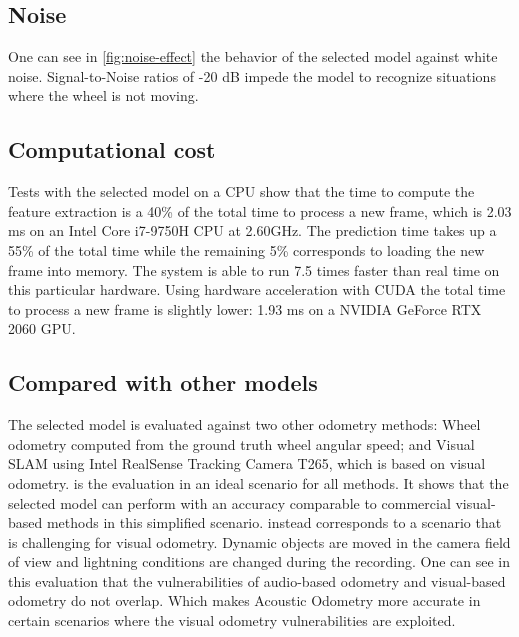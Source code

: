 \subsection{Noise} One can see in \cref{fig:noise-effect} the behavior of the
selected model against white noise. Signal-to-Noise ratios of -20 dB impede the model to
recognize situations where the wheel is not moving.

\begin{figure*}
    \centering
\end{figure*}

\subsection{Computational cost} Tests with the selected model on a CPU show
that the time to compute the feature extraction is a 40\% of the total time to
process a new frame, which is 2.03 ms on an Intel\textregistered{}
Core\texttrademark{} i7-9750H CPU at 2.60GHz. The prediction time takes up a
55\% of the total time while the remaining 5\% corresponds to loading the new
frame into memory. The system is able to run 7.5 times faster than real time on
this particular hardware. Using hardware acceleration with CUDA the total time
to process a new frame is slightly lower: 1.93 ms on a NVIDIA GeForce RTX 2060
GPU.

\subsection{Compared with other models} The selected model is evaluated against
two other odometry methods: Wheel odometry computed from the ground truth wheel
angular speed; and Visual SLAM using Intel\textregistered{}
RealSense\texttrademark{} Tracking Camera T265, which is based on visual
odometry.  is the evaluation in an ideal scenario for
all methods. It shows that the selected model can perform with an accuracy
comparable to commercial visual-based methods in this simplified scenario.
 instead corresponds to a scenario that is challenging
for visual odometry. Dynamic objects are moved in the camera field of view and
lightning conditions are changed during the recording. One can see in this
evaluation that the vulnerabilities of audio-based odometry and visual-based
odometry do not overlap. Which makes Acoustic Odometry more accurate in certain
scenarios where the visual odometry vulnerabilities are exploited.

